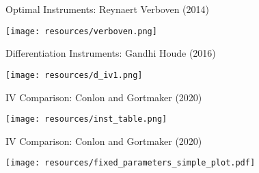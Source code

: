 \begin{frame}{Optimal Instruments: Reynaert Verboven (2014)}
\begin{center}
\texttt{[image: resources/verboven.png]}
\end{center}
\end{frame}


\begin{frame}{Differentiation Instruments: Gandhi Houde (2016)}
\begin{center}
\texttt{[image: resources/d\_iv1.png]}
\end{center}
\end{frame}

\begin{frame}{IV Comparison: Conlon and Gortmaker (2020)}
\begin{center}
\texttt{[image: resources/inst\_table.png]}
\end{center}
\end{frame}

\begin{frame}{IV Comparison: Conlon and Gortmaker (2020)}
\begin{center}
\texttt{[image: resources/fixed\_parameters\_simple\_plot.pdf]}
\end{center}
\end{frame}




